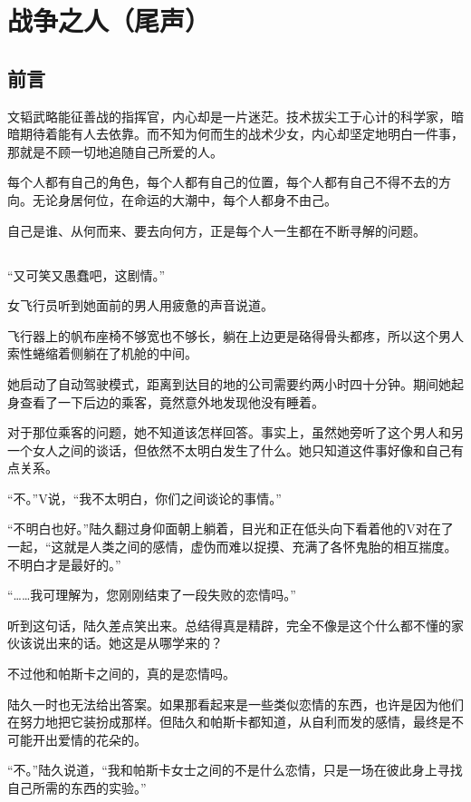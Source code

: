 \chapter{战争之人（尾声）}
\section*{前言}
文韬武略能征善战的指挥官，内心却是一片迷茫。技术拔尖工于心计的科学家，暗暗期待着能有人去依靠。而不知为何而生的战术少女，内心却坚定地明白一件事，那就是不顾一切地追随自己所爱的人。

每个人都有自己的角色，每个人都有自己的位置，每个人都有自己不得不去的方向。无论身居何位，在命运的大潮中，每个人都身不由己。

自己是谁、从何而来、要去向何方，正是每个人一生都在不断寻解的问题。

\lineseparator


\section*{}

“又可笑又愚蠢吧，这剧情。”

女飞行员听到她面前的男人用疲惫的声音说道。

飞行器上的帆布座椅不够宽也不够长，躺在上边更是硌得骨头都疼，所以这个男人索性蜷缩着侧躺在了机舱的中间。

她启动了自动驾驶模式，距离到达目的地的公司需要约两小时四十分钟。期间她起身查看了一下后边的乘客，竟然意外地发现他没有睡着。

对于那位乘客的问题，她不知道该怎样回答。事实上，虽然她旁听了这个男人和另一个女人之间的谈话，但依然不太明白发生了什么。她只知道这件事好像和自己有点关系。

“不。”V说，“我不太明白，你们之间谈论的事情。”

“不明白也好。”陆久翻过身仰面朝上躺着，目光和正在低头向下看着他的V对在了一起，“这就是人类之间的感情，虚伪而难以捉摸、充满了各怀鬼胎的相互揣度。不明白才是最好的。”

“……我可理解为，您刚刚结束了一段失败的恋情吗。”

听到这句话，陆久差点笑出来。总结得真是精辟，完全不像是这个什么都不懂的家伙该说出来的话。她这是从哪学来的？

不过他和帕斯卡之间的，真的是恋情吗。

陆久一时也无法给出答案。如果那看起来是一些类似恋情的东西，也许是因为他们在努力地把它装扮成那样。但陆久和帕斯卡都知道，从自利而发的感情，最终是不可能开出爱情的花朵的。

“不。”陆久说道，“我和帕斯卡女士之间的不是什么恋情，只是一场在彼此身上寻找自己所需的东西的实验。”

